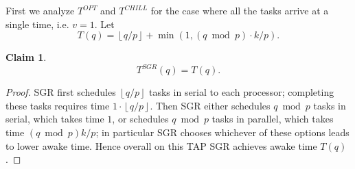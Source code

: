 \documentclass[twocolumn]{article}[10pt]
\newcommand{\floor}[1]{\left\lfloor #1 \right\rfloor}
\newtheorem{claim}{Claim}
\begin{document}
First we analyze $T^{OPT}$ and $T^{CHILL}$ for the case where all
the tasks arrive at a single time, i.e. $v=1$.
Let $$T(q) = \floor{q/p} + \min(1, (q\bmod p)\cdot k/p). $$

\begin{claim}
  \label{clm:sgr_single}
  $$T^{SGR}(q) = T(q).$$
\end{claim}
\begin{proof}
  SGR first schedules $\floor{q/p}$ tasks in serial to
  each processor; completing these tasks requires time $1\cdot \floor{q/p}$. 
  Then SGR either schedules $q\bmod p$ tasks
  in serial, which takes time $1$, or schedules $q\bmod p$
  tasks in parallel, which takes time $(q\bmod p)k/p$; in
  particular SGR chooses whichever of these options leads to
  lower awake time. Hence overall on this TAP
  SGR achieves awake time $T(q)$.
\end{proof}
\end{document}
